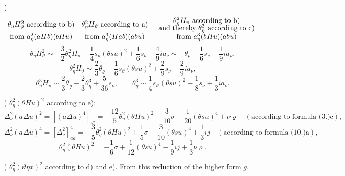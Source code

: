 \documentclass[11pt]{article}
\newcommand{\A}{\Delta}
\newcommand{\R}{\varrho}
\begin{document}
)
\[
\begin{array}{@{}c@{\quad}c@{\quad}c@{}}
\theta_\eta H_\vartheta^2\text{ according to b)}&
\theta_\eta^2H_\vartheta\text{ according to a)}&
\begin{array}{c}\theta_\eta^2H_\vartheta\text{ according to b)}\\[-0.2em]\text{and thereby }\theta_\eta^3\text{ according to c)}\end{array}\\
\text{from }a_\eta^2(aHb)(bHu)&
\text{from }a_\eta^3(Hab)(abu)&
\text{from }a_\eta^3(bHu)(abu)
\end{array}
\]
\[
\theta_\eta H_\vartheta^2\sim-\frac32\theta_\eta^2H_\vartheta-\frac14s_\vartheta(\theta su)^2+\frac16s_\nu-\frac49ia_\nu
\sim-\theta_\R-\frac16s_\nu-\frac19ia_\nu,
\]
\[
\theta_\eta^2H_\vartheta\sim\frac23\theta_\R-\frac16s_\vartheta(\theta su)^2+\frac29s_\nu-\frac29ia_\nu,
\]
\[
\theta_\eta^3H_\vartheta\sim\frac23\theta_\R-\frac23\theta_\eta^3+\frac5{36}s_\nu,
\qquad
\theta_\eta^3\sim\frac14s_\vartheta(\theta su)^2-\frac18s_\nu+\frac13ia_\nu.
\]

) $\theta_\eta^2(\theta Hu)^2$ according to e):
\[
\A_\nu^2(a\A u)^2=[(a\A u)^4]_{\nu^2}
=-\frac{12}{5}\theta_\eta^2(\theta Hu)^2-\frac3{10}\sigma-\frac1{20}(\theta su)^4+\nu\R
\quad(\text{according to formula (3.)c}),
\]
\[
\A_\nu^2(a\A u)^4=[\A_\nu^2]_{aa}^4=-\frac35\theta_\eta^2(\theta Hu)^2+\frac15\sigma-\frac3{10}(\theta su)^4+\frac13ij
\quad(\text{according to formula (10.)a}),
\]
\[
\theta_\eta^2(\theta Hu)^2=-\frac16\sigma+\frac1{12}(\theta su)^4-\frac19ij+\frac13\nu\R.
\]

) $\theta_\eta^2(\vartheta\eta x)^2$ according to d) and e). From this reduction of the higher form $g$.
\end{document}
